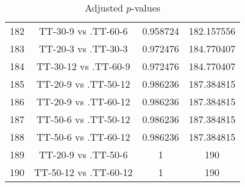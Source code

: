 \documentclass[a4paper,10pt]{article}
\begin{document}
\begin{landscape}
\begin{table}[!htp]
\begin{tabular}{cccc}
182&TT-30-9 vs .TT-60-6&0.958724&182.157556\\
183&TT-20-3 vs .TT-30-3&0.972476&184.770407\\
184&TT-30-12 vs .TT-60-9&0.972476&184.770407\\
185&TT-20-9 vs .TT-50-12&0.986236&187.384815\\
186&TT-20-9 vs .TT-60-12&0.986236&187.384815\\
187&TT-50-6 vs .TT-50-12&0.986236&187.384815\\
188&TT-50-6 vs .TT-60-12&0.986236&187.384815\\
189&TT-20-9 vs .TT-50-6&1&190\\
190&TT-50-12 vs .TT-60-12&1&190\\
\hline
\end{tabular}
\caption{Adjusted $p$-values}
\end{table}

\end{landscape}
\end{document}

